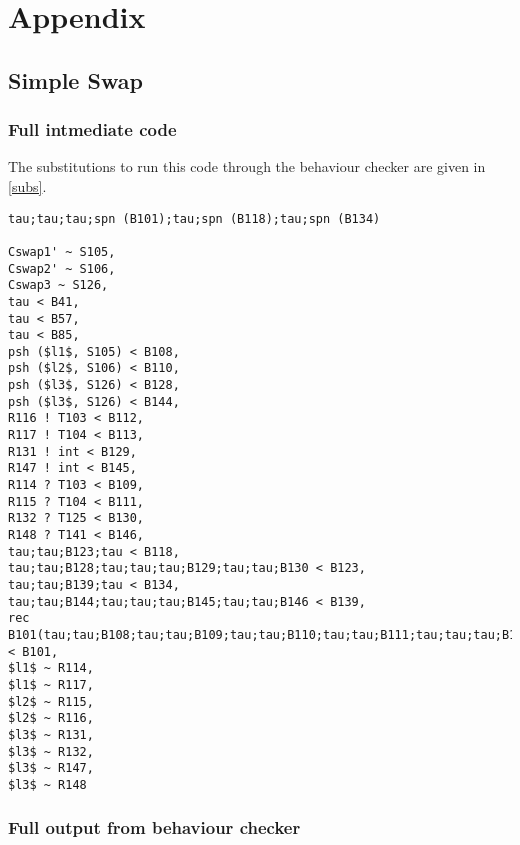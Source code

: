 \chapter*{Appendix}

\section*{Simple Swap}

\subsection*{Full intmediate code}

The substitutions to run this code through the behaviour checker are given in \ref{subs}. 

\begin{lstlisting} 
tau;tau;tau;spn (B101);tau;spn (B118);tau;spn (B134)

Cswap1' ~ S105,
Cswap2' ~ S106,
Cswap3 ~ S126,
tau < B41,
tau < B57,
tau < B85,
psh ($l1$, S105) < B108,
psh ($l2$, S106) < B110,
psh ($l3$, S126) < B128,
psh ($l3$, S126) < B144,
R116 ! T103 < B112,
R117 ! T104 < B113,
R131 ! int < B129,
R147 ! int < B145,
R114 ? T103 < B109,
R115 ? T104 < B111,
R132 ? T125 < B130,
R148 ? T141 < B146,
tau;tau;B123;tau < B118,
tau;tau;B128;tau;tau;tau;B129;tau;tau;B130 < B123,
tau;tau;B139;tau < B134,
tau;tau;B144;tau;tau;tau;B145;tau;tau;B146 < B139,
rec B101(tau;tau;B108;tau;tau;B109;tau;tau;B110;tau;tau;B111;tau;tau;tau;B112;tau;tau;tau;B113;tau;tau;B101) < B101,
$l1$ ~ R114,
$l1$ ~ R117,
$l2$ ~ R115,
$l2$ ~ R116,
$l3$ ~ R131,
$l3$ ~ R132,
$l3$ ~ R147,
$l3$ ~ R148
\end{lstlisting}

\subsection*{Full output from behaviour checker}

